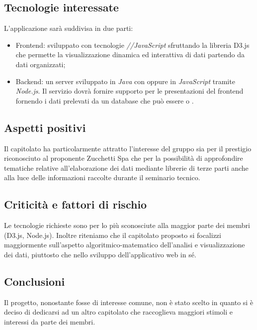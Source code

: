 \subsection{Tecnologie interessate}
L'applicazione sarà suddivisa in due parti:
\begin{itemize}
    \item Frontend: sviluppato con tecnologie \textit{//JavaScript} sfruttando la libreria D3.js che permette la visualizzazione dinamica ed interattiva di dati partendo da dati organizzati;
    \item Backend: un server sviluppato in \textit{Java} con \textit{} oppure in \textit{JavaScript} tramite \textit{Node.js}. Il servizio dovrà fornire supporto per le presentazioni del frontend fornendo i dati prelevati da un database che può essere \textit{} o \textit{}.
\end{itemize}

\subsection{Aspetti positivi}
Il capitolato ha particolarmente attratto l'interesse del gruppo sia per il prestigio riconosciuto al proponente Zucchetti Spa che per la possibilità di approfondire tematiche relative all'elaborazione dei dati mediante librerie di terze parti anche alla luce delle informazioni raccolte durante il seminario tecnico.

\subsection{Criticità e fattori di rischio}
Le tecnologie richieste sono per lo più sconosciute alla maggior parte dei membri (D3.js, Node.js). Inoltre riteniamo che il capitolato proposto si focalizzi maggiormente sull'aspetto algoritmico-matematico dell'analisi e visualizzazione dei dati, piuttosto che nello sviluppo dell'applicativo web in sé.

\subsection{Conclusioni}
Il progetto, nonostante fosse di interesse comune, non è stato scelto in quanto si è deciso di dedicarsi ad un altro capitolato che raccoglieva maggiori stimoli e interessi da parte dei membri.
